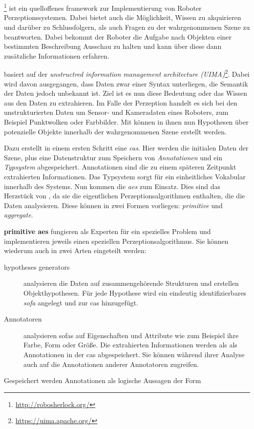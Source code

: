 \section{\robosherlock}
\label{sec:robosherlock}
\robosherlock\footnote{\url{http://robosherlock.org/}} ist ein quelloffenes \gls{framework} zur Implementierung von Roboter Perzeptionssystemen. Dabei bietet \robosherlock auch die Möglichkeit, Wissen zu akquirieren und darüber zu Schlussfolgern, als auch Fragen zu der wahrgenommenen Szene zu beantworten. Dabei bekommt der Roboter die Aufgabe nach Objekten einer bestimmten Beschreibung Ausschau zu halten und kann über diese dann zusätzliche Informationen erfahren\cite{robosherlock}. \par
\robosherlock basiert auf der \textit{unstructred information management architecture (UIMA)}\footnote{\url{https://uima.apache.org/}}. Dabei wird davon ausgegangen, dass Daten zwar einer Syntax unterliegen, die Semantik der Daten jedoch unbekannt ist. Ziel ist es nun diese Bedeutung oder das Wissen aus den Daten zu extrahieren.  Im Falle der Perzeption handelt es sich bei den unstrukturierten Daten um Sensor- und Kameradaten eines Roboters, zum Beispiel Punktwolken oder Farbbilder. Mit \robosherlock können in ihnen nun Hypothesen über potenzielle Objekte innerhalb der wahrgenommenen Szene erstellt werden. \par
Dazu erstellt \robosherlock in einem ersten Schritt eine \textit{\gls{cas}}. Hier werden die initialen Daten der Szene, plus eine Datenstruktur zum Speichern von \textit{Annotationen} und ein \textit{Typsystem} abgespeichert. Annotationen sind die zu einem späteren Zeitpunkt extrahierten Informationen. Das Typsystem sorgt für ein einheitliches Vokabular innerhalb des Systems.  \newline
Nun kommen die \textit{\glspl{ae}} zum Einsatz. Dies sind das Herzstück von \robosherlock, da sie die eigentlichen Perzeptionsalgorithmen enthalten, die die Daten analysieren. Diese können in zwei Formen vorliegen: \textit{primitive} und \textit{aggregate}. \par
\textbf{primitive \glspl{ae}} fungieren als Experten für ein spezielles Problem und implementieren jeweils einen speziellen Perzeptionsalgorithmus. Sie können wiederum auch in zwei Arten eingeteilt werden:
\begin{description}
\item[hypotheses generators] analysieren die Daten auf zusammengehörende Strukturen und erstellen Objekthypothesen. Für jede Hypothese wird ein eindeutig identifizierbares \textit{\gls{sofa}} angelegt und zur \gls{cas} hinzugefügt.
\item[Annotatoren] analysieren \glspl{sofa} auf Eigenschaften und Attribute wie zum Beispiel ihre Farbe, Form oder Größe. Die extrahierten Informationen werden als als Annotationen in der \gls{cas} abgespeichert. Sie können während ihrer Analyse auch auf die Annotationen anderer Annotatoren zugreifen.\end{description} Gespeichert werden Annotationen als logische Aussagen der Form 

